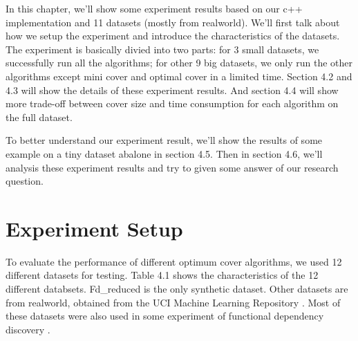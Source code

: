 \documentclass[11pt]{book}
\begin{document}
In this chapter, we'll show some experiment results based on our c++ implementation and 11 datasets (mostly from realworld). We'll first talk about how we setup the experiment and introduce the characteristics of the datasets. The experiment is basically divied into two parts: for 3 small datasets, we successfully run all the algorithms; for other 9 big datasets, we only run the other algorithms except mini cover and optimal cover in a limited time. Section 4.2 and 4.3 will show the details of these experiment results. And section 4.4 will show more trade-off between cover size and time consumption for each algorithm on the full dataset.

To better understand our experiment result, we'll show the results of some example on a tiny dataset abalone in section 4.5. Then in section 4.6, we'll analysis these experiment results and try to given some answer of our research question.

\section{Experiment Setup}
	
To evaluate the performance of different optimum cover algorithms, we used 12 different datasets for testing. Table 4.1 shows the characteristics of the 12 different databsets. Fd\_reduced is the only synthetic dataset. Other datasets are from realworld, obtained from the UCI Machine Learning Repository \cite{asuncion2007uci}. Most of these datasets were also  used in some experiment of functional dependency discovery \cite{papenbrock2015functional}.
\end{document}
